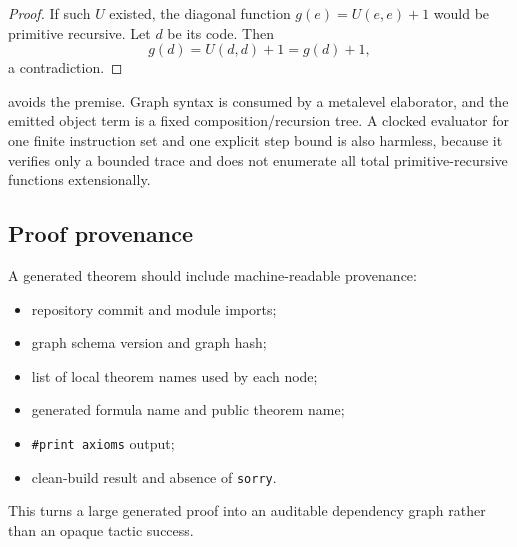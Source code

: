 \begin{proof}
If such \(U\) existed, the diagonal function \(g(e)=U(e,e)+1\) would be primitive recursive.  Let \(d\) be its code.  Then
\[
 g(d)=U(d,d)+1=g(d)+1,
\]
a contradiction.
\end{proof}

\KIFCR avoids the premise.  Graph syntax is consumed by a metalevel elaborator, and the emitted object term is a fixed composition/recursion tree.  A clocked evaluator for one finite instruction set and one explicit step bound is also harmless, because it verifies only a bounded trace and does not enumerate all total primitive-recursive functions extensionally.

\subsection{Proof provenance}

A generated theorem should include machine-readable provenance:
\begin{itemize}
  \item repository commit and module imports;
  \item graph schema version and graph hash;
  \item list of local theorem names used by each node;
  \item generated formula name and public theorem name;
  \item \texttt{\#print axioms} output;
  \item clean-build result and absence of \texttt{sorry}.
\end{itemize}
This turns a large generated proof into an auditable dependency graph rather than an opaque tactic success.
